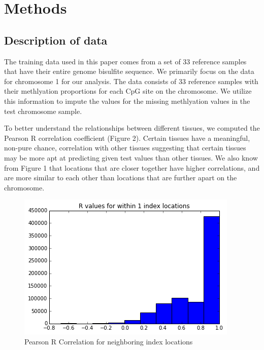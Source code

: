 \documentclass{article} %
\begin{document}
\section{Methods}
\subsection{Description of data}
The training data used in this paper comes from a set of 33 reference samples that have their entire genome bisulfite sequence. We primarily focus on the data for chromosome 1 for our analysis. The data consists of 33 reference samples with their methlyation proportions for each CpG site on the chromosome. We utilize this information to impute the values for the missing methlyation values in the test chromosome sample.

To better understand the relationships between different tissues, we computed the Pearson R correlation coefficient (Figure 2). Certain tissues have a meaningful, non-pure chance, correlation with other tissues suggesting that certain tissues may be more apt at predicting given test values than other tissues. We also know from Figure 1 that locations that are closer together have higher correlations, and are more similar to each other than locations that are further apart on the chromosome.

\begin{figure}[!ht]
\begin{center}
\caption{Pearson R Correlation for neighboring index locations}
\begin{minipage}[b]{0.40\linewidth}
	\includegraphics[scale=0.40]{CorrelationByLocation.png}
\end{minipage}
\quad
\end{center}
\end{figure}
\end{document}
